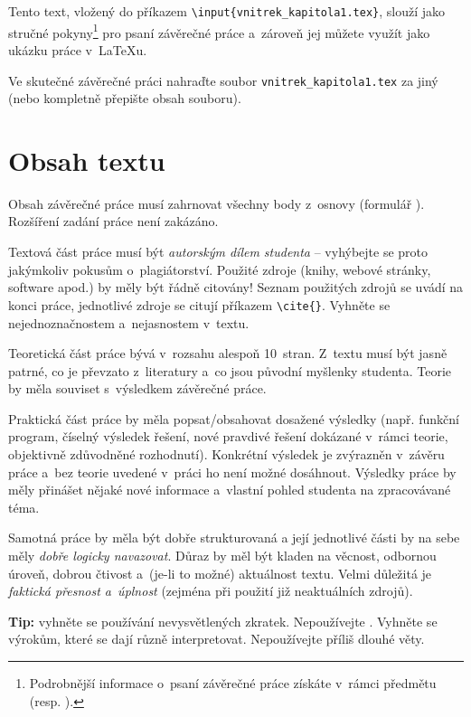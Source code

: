 \small %
Tento text, vložený do  příkazem \texttt{\textbackslash input\{vnitrek\_kapitola1.tex\}}, slouží jako stručné pokyny\footnote{Podrobnější informace o~psaní závěrečné práce získáte v~rámci předmětu  (resp. ).} pro psaní závěrečné práce a~zároveň jej můžete využít jako ukázku práce v~\LaTeX{u}.
\par 
Ve skutečné závěrečné práci nahraďte soubor \texttt{vnitrek\_kapitola1.tex} za jiný (nebo kompletně přepište obsah souboru).

\newcommand{\prikaz}[1]{\texttt{\textbackslash #1\{\}}} %

 
\section{Obsah textu}  
Obsah závěrečné práce musí zahrnovat všechny body z~osnovy (formulář ). Rozšíření zadání práce není zakázáno.
\par 
Textová část práce musí být {\em autorským dílem studenta} -- vyhýbejte se proto jakýmkoliv pokusům o~plagiátorství. Použité zdroje (knihy, webové stránky, software apod.) by měly být řádně citovány! Seznam použitých zdrojů se uvádí na konci práce, jednotlivé zdroje se citují příkazem \prikaz{cite}. Vyhněte se nejednoznačnostem a~nejasnostem v~textu.
\par
Teoretická část práce bývá v~rozsahu alespoň 10~stran. Z~textu musí být jasně patrné, co je převzato z~literatury a~co jsou původní myšlenky studenta. Teorie by měla souviset s~výsledkem závěrečné práce.
\par 
Praktická část práce by měla popsat/obsahovat dosažené výsledky (např. funkční program, číselný výsledek řešení, nové pravdivé řešení dokázané v~rámci teorie, objektivně zdůvodněné rozhodnutí). Konkrétní výsledek je zvýrazněn v~závěru práce a~bez teorie uvedené v~práci ho není možné dosáhnout. Výsledky práce by měly přinášet nějaké nové informace a~vlastní pohled studenta na zpracovávané téma.
\par
Samotná práce by měla být dobře strukturovaná a její jednotlivé části by na sebe měly {\em dobře logicky navazovat}. Důraz by měl být kladen na věcnost, odbornou úroveň, dobrou čtivost a~(je-li to možné) aktuálnost textu. Velmi důležitá je {\em faktická přesnost a~úplnost} (zejména při použití již neaktuálních zdrojů).
\par
{\bf Tip:} vyhněte se používání nevysvětlených zkratek. Nepoužívejte . Vyhněte se výrokům, které se dají různě interpretovat. Nepoužívejte příliš dlouhé věty. 



